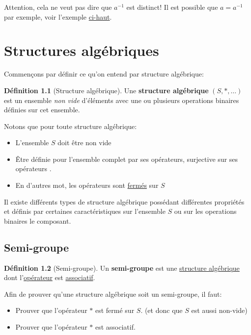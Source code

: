 \documentclass[12pt]{book}
\newcommand\todo[1]{\phantom{#1}}
\theoremstyle{definition}
\newtheorem{definition}{Définition}[section]
\begin{document}
Attention, cela ne veut pas dire que $a^{-1}$ est distinct! Il est possible que $a = a^{-1}$ par exemple, voir l'exemple \hyperref[thm:inverse_neutre]{ci-haut}.



\chapter{Structures algébriques}
Commençons par définir ce qu'on entend par structure algébrique:
\begin{definition}[Structure algébrique]
    \label{def:structure_algebrique}
    Une \textbf{structure algébrique} $(S, \ast, \dots)$ est un ensemble \textit{non vide} d'éléments avec une ou plusieurs
    operations binaires définies sur cet ensemble.
\end{definition}
Notons que pour toute structure algébrique:
\begin{itemize}
    \item L'ensemble $S$ doit être non vide
    \item Être définie pour l'ensemble complet par ses opérateurs, surjective sur ses opérateurs \todo{Add link}.
    \item En d'autres mot, les opérateurs sont \hyperref[def:fermeture]{fermés} sur $S$
\end{itemize}

Il existe différents types de structure algébrique possédant différentes propriétés et définis par certaines
caractéristiques sur l'ensemble $S$ ou sur les operations binaires le composant.

\section{Semi-groupe}
\begin{definition}[Semi-groupe]
    \label{def:semi_groupe}
    Un \textbf{semi-groupe} est une \hyperref[def:structure_algebrique]{structure algébrique} dont l'\hyperref[def:operation_binaire]{opérateur} est 
    \hyperref[def:associativite]{associatif}.
\end{definition}
Afin de prouver qu'une structure algébrique soit un semi-groupe, il faut:
\begin{itemize}
    \item Prouver que l'opérateur $\ast$ est fermé sur $S$. (et donc que $S$ est aussi non-vide)
    \item Prouver que l'opérateur $\ast$ est associatif.
\end{itemize}
\end{document}

